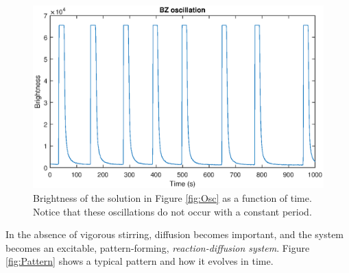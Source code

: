 \documentclass[twocolumn,amsmath,amssymb,aps]{revtex4}
\begin{document}
\begin{figure}[!htb]
	\centering
	\includegraphics[scale=0.45]{osc-lab}
	\caption{Brightness of the solution in Figure \ref{fig:Osc} as a function of time. Notice that these oscillations do not occur with a constant period.}
	\label{fig:osc-time}
\end{figure}


In the absence of vigorous stirring, diffusion becomes important, and the system becomes an excitable, pattern-forming, \textit{reaction-diffusion system}. Figure \ref{fig:Pattern} shows a typical pattern and how it evolves in time. 
\end{document}
